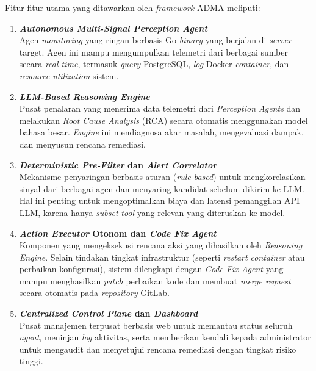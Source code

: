 Fitur-fitur utama yang ditawarkan oleh \textit{framework} ADMA meliputi:
\begin{enumerate}[label=\arabic*., leftmargin=*]
  \item \textbf{\textit{Autonomous Multi-Signal Perception Agent}}\\
        Agen \textit{monitoring} yang ringan berbasis Go \textit{binary} yang berjalan di \textit{server} target. Agen ini mampu mengumpulkan telemetri dari berbagai sumber secara \textit{real-time}, termasuk \textit{query} PostgreSQL, \textit{log} Docker \textit{container}, dan \textit{resource utilization} sistem.

  \item \textbf{\textit{LLM-Based Reasoning Engine}}\\
        Pusat penalaran yang menerima data telemetri dari \textit{Perception Agents} dan melakukan \textit{Root Cause Analysis} (RCA) secara otomatis menggunakan model bahasa besar. \textit{Engine} ini mendiagnosa akar masalah, mengevaluasi dampak, dan menyusun rencana remediasi.

  \item \textbf{\textit{Deterministic Pre-Filter} dan \textit{Alert Correlator}}\\
        Mekanisme penyaringan berbasis aturan (\textit{rule-based}) untuk mengkorelasikan sinyal dari berbagai agen dan menyaring kandidat sebelum dikirim ke LLM. Hal ini penting untuk mengoptimalkan biaya dan latensi pemanggilan API LLM, karena hanya \textit{subset} \textit{tool} yang relevan yang diteruskan ke model.

  \item \textbf{\textit{Action Executor} Otonom dan \textit{Code Fix Agent}}\\
        Komponen yang mengeksekusi rencana aksi yang dihasilkan oleh \textit{Reasoning Engine}. Selain tindakan tingkat infrastruktur (seperti \textit{restart container} atau perbaikan konfigurasi), sistem dilengkapi dengan \textit{Code Fix Agent} yang mampu menghasilkan \textit{patch} perbaikan kode dan membuat \textit{merge request} secara otomatis pada \textit{repository} GitLab.

  \item \textbf{\textit{Centralized Control Plane} dan \textit{Dashboard}}\\
        Pusat manajemen terpusat berbasis web untuk memantau status seluruh \textit{agent}, meninjau \textit{log} aktivitas, serta memberikan kendali kepada administrator untuk mengaudit dan menyetujui rencana remediasi dengan tingkat risiko tinggi.
\end{enumerate}

